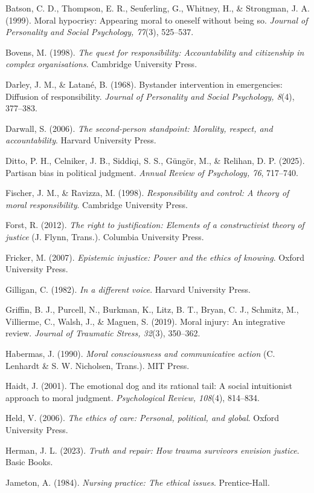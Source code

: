 \documentclass[
  11pt,
]{article}
\begin{document}
Batson, C. D., Thompson, E. R., Seuferling, G., Whitney, H., \&
Strongman, J. A. (1999). Moral hypocrisy: Appearing moral to oneself
without being so. \emph{Journal of Personality and Social Psychology,
77}(3), 525--537.

Bovens, M. (1998). \emph{The quest for responsibility: Accountability
and citizenship in complex organisations}. Cambridge University Press.

Darley, J. M., \& Latané, B. (1968). Bystander intervention in
emergencies: Diffusion of responsibility. \emph{Journal of Personality
and Social Psychology, 8}(4), 377--383.

Darwall, S. (2006). \emph{The second-person standpoint: Morality,
respect, and accountability}. Harvard University Press.

Ditto, P. H., Celniker, J. B., Siddiqi, S. S., Güngör, M., \& Relihan,
D. P. (2025). Partisan bias in political judgment. \emph{Annual Review
of Psychology, 76}, 717--740.

Fischer, J. M., \& Ravizza, M. (1998). \emph{Responsibility and control:
A theory of moral responsibility}. Cambridge University Press.

Forst, R. (2012). \emph{The right to justification: Elements of a
constructivist theory of justice} (J. Flynn, Trans.). Columbia
University Press.

Fricker, M. (2007). \emph{Epistemic injustice: Power and the ethics of
knowing}. Oxford University Press.

Gilligan, C. (1982). \emph{In a different voice}. Harvard University
Press.

Griffin, B. J., Purcell, N., Burkman, K., Litz, B. T., Bryan, C. J.,
Schmitz, M., Villierme, C., Walsh, J., \& Maguen, S. (2019). Moral
injury: An integrative review. \emph{Journal of Traumatic Stress,
32}(3), 350--362.

Habermas, J. (1990). \emph{Moral consciousness and communicative action}
(C. Lenhardt \& S. W. Nicholsen, Trans.). MIT Press.

Haidt, J. (2001). The emotional dog and its rational tail: A social
intuitionist approach to moral judgment. \emph{Psychological Review,
108}(4), 814--834.

Held, V. (2006). \emph{The ethics of care: Personal, political, and
global}. Oxford University Press.

Herman, J. L. (2023). \emph{Truth and repair: How trauma survivors
envision justice}. Basic Books.

Jameton, A. (1984). \emph{Nursing practice: The ethical issues}.
Prentice-Hall.
\end{document}
